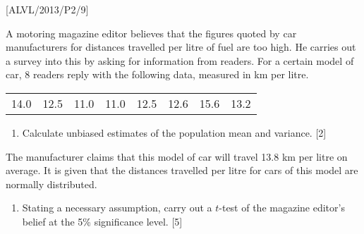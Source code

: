 \item {[}ALVL/2013/P2/9{]}

A motoring magazine editor believes that the figures quoted by car
manufacturers for distances travelled per litre of fuel are too high.
He carries out a survey into this by asking for information from readers.
For a certain model of car, 8 readers reply with the following data,
measured in km per litre.
\noindent \begin{center}
\begin{tabular}{cccccccc}
14.0 & 12.5 & 11.0 & 11.0 & 12.5 & 12.6 & 15.6 & 13.2\tabularnewline
\end{tabular}
\par\end{center}
\begin{enumerate}
\item Calculate unbiased estimates of the population mean and variance.
\hfill{}{[}2{]}
\end{enumerate}
The manufacturer claims that this model of car will travel 13.8 km
per litre on average. It is given that the distances travelled per
litre for cars of this model are normally distributed. 
\begin{enumerate}
\item Stating a necessary assumption, carry out a $t$-test of the magazine
editor's belief at the 5\% significance level. \hfill{}{[}5{]}
\end{enumerate}
